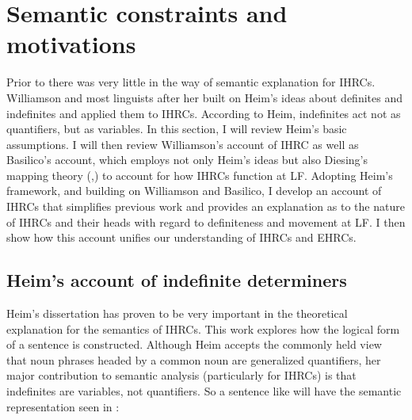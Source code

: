 \documentclass[output=paper]{LSP/langsci}
\begin{document}
\section{Semantic constraints and motivations}\label{sec:boyle:6} 
 
Prior to \citet{Williamson1987} there was very little in the way of semantic explanation for IHRCs. Williamson and most linguists after her built on Heim's \citeyearpar{Heim1982} ideas about definites and indefinites and applied them to IHRCs. According to Heim, indefinites act not as quantifiers, but as variables.  In this section, I will review Heim's basic assumptions. I will then review Williamson's account of IHRC \citeyearpar{Williamson1987} as well as Basilico's \citeyearpar{Basilico1996} account, which employs not only Heim's ideas but also Diesing's mapping theory (\citeyear*{Diesing1990,Diesing1992a},) to account for how IHRCs function at LF. Adopting Heim's framework, and building on Williamson and Basilico, I develop an account of IHRCs that simplifies previous work and provides an explanation as to the nature of IHRCs and their heads with regard to definiteness and movement at LF. I then show how this account unifies our understanding of IHRCs and EHRCs.

\subsection{Heim's account of indefinite determiners}\label{sec:boyle:6.1}

Heim's \citeyearpar{Heim1982} dissertation has proven to be very important in the theoretical explanation for the semantics of IHRCs. This work explores how the logical form of a sentence is constructed. Although Heim accepts the commonly held view that noun phrases headed by a common noun are generalized quantifiers, her major contribution to semantic analysis (particularly for IHRCs) is that indefinites are variables, not quantifiers.  So a sentence like  will have the semantic representation seen in :
\end{document}
